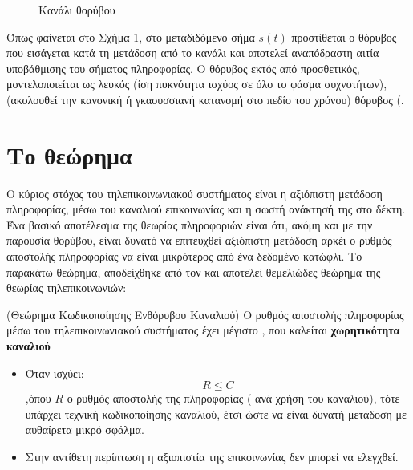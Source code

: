\begin{figure}[h]
\caption{Κανάλι  θορύβου}
\label{fig:awgn channel}
\end{figure}

Όπως φαίνεται στο Σχήμα \ref{fig:awgn channel}, στο μεταδιδόμενο σήμα $s(t)$ προστίθεται ο θόρυβος που εισάγεται κατά τη μετάδοση από το κανάλι και αποτελεί αναπόδραστη αιτία υποβάθμισης του σήματος πληροφορίας. Ο θόρυβος εκτός από προσθετικός, μοντελοποιείται ως λευκός (ίση πυκνότητα ισχύος σε όλο το φάσμα συχνοτήτων),  (ακολουθεί την κανονική ή γκαουσσιανή κατανομή στο πεδίο του χρόνου) θόρυβος (.

\section{Το θεώρημα }
Ο κύριος στόχος του τηλεπικοινωνιακού συστήματος είναι η αξιόπιστη μετάδοση πληροφορίας, μέσω του καναλιού επικοινωνίας και η σωστή ανάκτησή της στο δέκτη. Ένα βασικό αποτέλεσμα της θεωρίας πληροφοριών είναι ότι, ακόμη και με την παρουσία θορύβου, είναι δυνατό να επιτευχθεί αξιόπιστη μετάδοση αρκέι ο ρυθμός αποστολής πληροφορίας να είναι μικρότερος από ένα δεδομένο κατώφλι. Το παρακάτω θεώρημα, αποδείχθηκε από τον  και αποτελεί θεμελιώδες θεώρημα της θεωρίας τηλεπικοινωνιών:

\begin{theorem}(Θεώρημα Κωδικοποίησης Ενθόρυβου Καναλιού)
Ο ρυθμός αποστολής πληροφορίας μέσω του τηλεπικοινωνιακού συστήματος έχει μέγιστο , που καλείται \textbf{χωρητικότητα καναλιού}
\begin{itemize}
\item Όταν ισχύει:
\begin{equation}
R\leq{C}
\end{equation}
,όπου $R$ ο ρυθμός αποστολής της πληροφορίας ( ανά χρήση του καναλιού), τότε υπάρχει τεχνική κωδικοποίησης καναλιού, έτσι ώστε να είναι δυνατή μετάδοση με αυθαίρετα μικρό σφάλμα.
\item Στην αντίθετη περίπτωση η αξιοπιστία της επικοινωνίας δεν μπορεί να ελεγχθεί.
\end{itemize}
\label{theorem:shannon}
\end{theorem}


